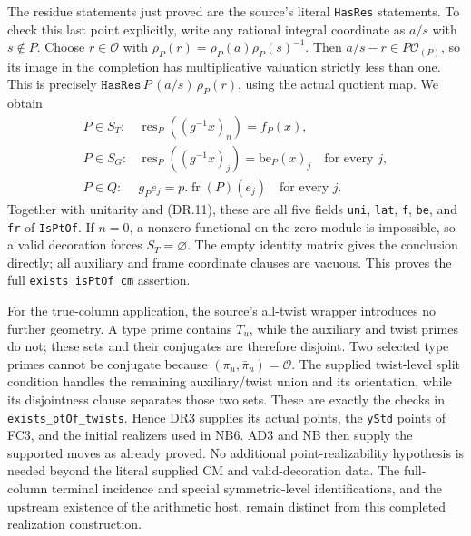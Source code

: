 \documentclass[11pt,a4paper]{article}
\numberwithin{equation}{section}
\theoremstyle{remark}\newtheorem{remark}[theorem]{Remark}
\begin{document}
The residue statements just proved are the source's literal
\texttt{HasRes} statements. To check this last point explicitly,
write any rational integral coordinate as $a/s$ with $s\notin P$.
Choose $r\in\mathcal O$ with
$\rho_P(r)=\rho_P(a)\rho_P(s)^{-1}$.
Then $a/s-r\in P\mathcal O_{(P)}$, so its image in the completion
has multiplicative valuation strictly less than one. This is precisely
$\texttt{HasRes}\,P\,(a/s)\,\rho_P(r)$, using the actual quotient
map. We obtain
\[
\begin{array}{ll}
 P\in S_T:&\operatorname{res}_P((g^{-1}x)_n)=f_P(x),\\
 P\in S_G:&\operatorname{res}_P((g^{-1}x)_j)
                                      =\mathrm{be}_P(x)_j
                                      \quad\text{for every }j,\\
 P\in Q:&g_Pe_j=p.\operatorname{fr}(P)(e_j)
                                      \quad\text{for every }j.
\end{array}                                                     \tag{DR.14}
\]
Together with unitarity and (DR.11), these are all five fields
\texttt{uni}, \texttt{lat}, \texttt{f}, \texttt{be}, and \texttt{fr}
of \texttt{IsPtOf}. If $n=0$, a nonzero functional on the zero
module is impossible, so a valid decoration forces $S_T=\varnothing$.
The empty identity matrix gives the conclusion directly; all auxiliary
and frame coordinate clauses are vacuous.
This proves the full \texttt{exists\_\allowbreak isPtOf\_\allowbreak cm} assertion.

For the true-column application, the source's all-twist wrapper
introduces no further geometry. A type prime contains $T_u$, while
the auxiliary and twist primes do not; these sets and their conjugates
are therefore disjoint. Two selected type primes cannot be conjugate
because $(\pi_u,\bar\pi_u)=\mathcal O$. The supplied twist-level
split condition handles the remaining auxiliary/twist union and its
orientation, while its disjointness clause separates those two sets.
These are exactly the checks in \texttt{exists\_\allowbreak ptOf\_\allowbreak twists}.
Hence DR3 supplies its actual points, the \texttt{yStd} points of FC3,
and the initial realizers used in NB6. AD3 and NB then supply the
supported moves as already proved. No additional point-realizability
hypothesis is needed beyond the literal supplied CM and valid-decoration
data. The full-column terminal incidence and special symmetric-level
identifications, and the upstream existence of the arithmetic host,
remain distinct from this completed realization construction.
\end{document}
